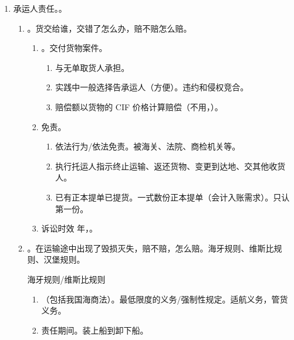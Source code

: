 \begin{enumerate}
        \begin{kk}{海运单}
          航程较短的运输。单货一起。不是物权凭证。不能单方转让。都具有运输合同证明和货物收据的作用。
        \end{kk}
  \item 承运人责任。。
        \begin{enumerate}
          \item {}。货交给谁，交错了怎么办，赔不赔怎么赔。
                \begin{enumerate}
                  \item {}。交付货物案件。
                        \begin{enumerate}
                          \item 与无单取货人承担。
                          \item 实践中一般选择告承运人（方便）。违约和侵权竞合。
                          \item 赔偿额以货物的 CIF 价格计算赔偿（不用，）。
                        \end{enumerate}
                  \item 免责。
                        \begin{enumerate}
                          \item 依法行为/依法免责。被海关、法院、商检机关等。
                          \item 执行托运人指示终止运输、返还货物、变更到达地、交其他收货人。
                          \item 已有正本提单已提货。一式数份正本提单（会计入账需求）。只认第一份。
                        \end{enumerate}
                  \item 诉讼时效  年，。
                \end{enumerate}
          \item {}。在运输途中出现了毁损灭失，赔不赔，怎么赔。海牙规则、维斯比规则、汉堡规则。
                \begin{kk}{海牙规则/维斯比规则}
                  \begin{enumerate}
                    \item {}（包括我国海商法）。最低限度的义务/强制性规定。适航义务，管货义务。
                    \item 责任期间。装上船到卸下船。

\end{enumerate}
\end{kk}
\end{enumerate}
\end{enumerate}
